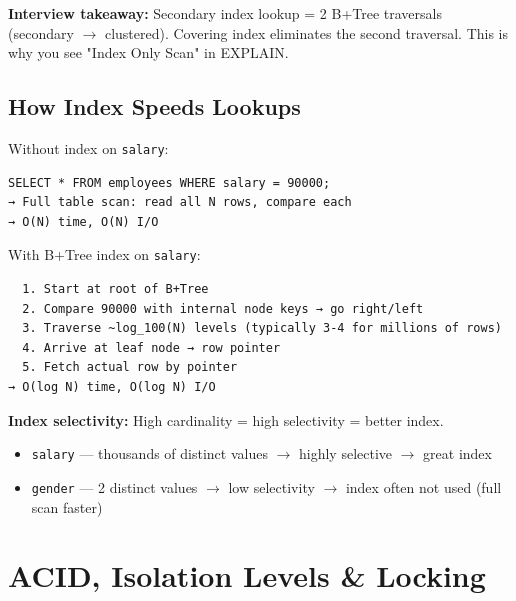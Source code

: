 \documentclass[11pt]{article}
\providecommand{\tightlist}{\setlength{\itemsep}{1pt}\setlength{\parskip}{0pt}}
\begin{document}
\textbf{Interview takeaway:} Secondary index lookup = 2 B+Tree traversals (secondary \(\rightarrow\) clustered). Covering index eliminates the second traversal. This is why you see "Index Only Scan" in EXPLAIN.

\subsection{How Index Speeds Lookups}\label{how-index-speeds-lookups}

Without index on \texttt{salary}:

\setcodelang{}

\begin{verbatim}
SELECT * FROM employees WHERE salary = 90000;
→ Full table scan: read all N rows, compare each
→ O(N) time, O(N) I/O
\end{verbatim}

With B+Tree index on \texttt{salary}:

\setcodelang{}

\begin{verbatim}
  1. Start at root of B+Tree
  2. Compare 90000 with internal node keys → go right/left
  3. Traverse ~log_100(N) levels (typically 3-4 for millions of rows)
  4. Arrive at leaf node → row pointer
  5. Fetch actual row by pointer
→ O(log N) time, O(log N) I/O
\end{verbatim}

\textbf{Index selectivity:} High cardinality = high selectivity = better index.

\begin{itemize}
\tightlist
\item
  \texttt{salary} --- thousands of distinct values \(\rightarrow\) highly selective \(\rightarrow\) great index
\item
  \texttt{gender} --- 2 distinct values \(\rightarrow\) low selectivity \(\rightarrow\) index often not used (full scan faster)
\end{itemize}

\section{ACID, Isolation Levels \& Locking}\label{acid-isolation-levels--locking}

\end{document}
